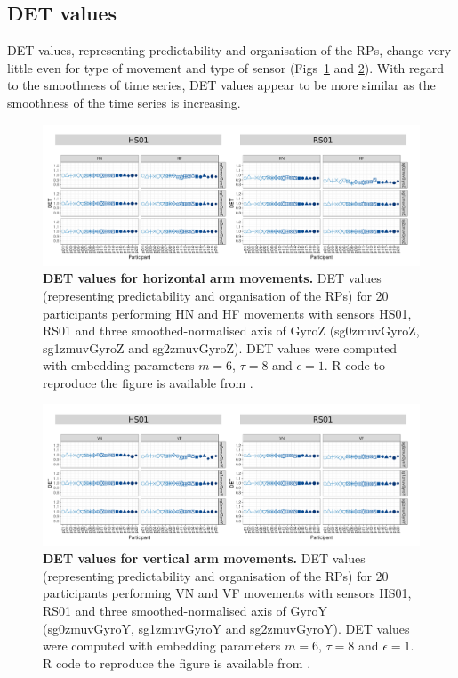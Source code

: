 \subsection{DET values}
DET values, representing predictability and organisation of the RPs, 
change very little even for type of movement and type of sensor
(Figs~\ref{fig:det_aH} and \ref{fig:det_aV}).
With regard to the smoothness of time series, DET values appear 
to be more similar as the smoothness of the time series is increasing.
\begin{figure}[!h]
\centering
\includegraphics[width=1.0\textwidth]{det_aH}
    \caption{
	{\bf DET values for horizontal arm movements.}	
    	DET values (representing predictability and organisation of the RPs)
	for 20 participants performing HN and HF movements
	with sensors HS01, RS01 and three smoothed-normalised axis 
	of GyroZ (sg0zmuvGyroZ, sg1zmuvGyroZ and sg2zmuvGyroZ).
	DET values were computed with 
	embedding parameters $m=6$, $\tau=8$ and $\epsilon=1$.
	R code to reproduce the figure is available from \cite{hwum2018}.
        }
    \label{fig:det_aH}
\end{figure}
\begin{figure}[!h]
\centering
\includegraphics[width=1.0\textwidth]{det_aV}
    \caption{
	{\bf DET values for vertical arm movements.}	
    	DET values (representing predictability and organisation of the RPs) 
	for 20 participants performing VN and VF movements
	with sensors HS01, RS01 and three smoothed-normalised axis 
	of GyroY (sg0zmuvGyroY, sg1zmuvGyroY and sg2zmuvGyroY).
	DET values were computed with 
	embedding parameters $m=6$, $\tau=8$ and $\epsilon=1$.
	R code to reproduce the figure is available from \cite{hwum2018}.
        }
    \label{fig:det_aV}
\end{figure}



